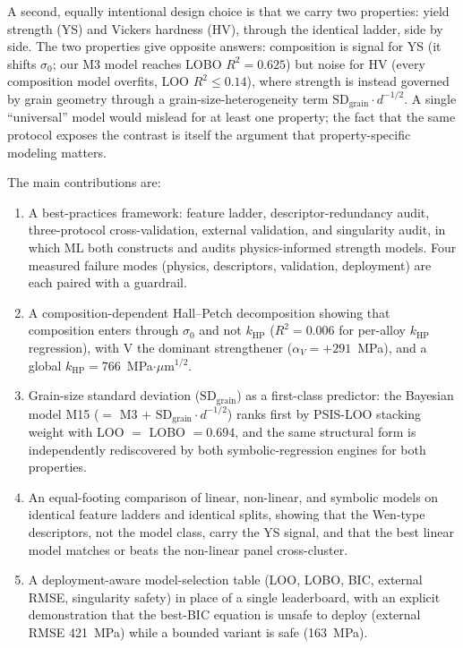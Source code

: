 \documentclass[5p,times,twocolumn]{elsarticle}
\begin{document}
A second, equally intentional design choice is that we carry two properties: yield strength (YS) and Vickers hardness (HV), through the identical ladder, side by side.
The two properties give opposite answers: composition is signal for YS (it shifts $\sigma_0$; our M3 model reaches LOBO $R^2 = 0.625$) but noise for HV (every composition model overfits, LOO $R^2 \leq 0.14$), where strength is instead governed by grain geometry through a grain-size-heterogeneity term $\text{SD}_\text{grain}\cdot d^{-1/2}$. A single ``universal'' model would mislead for at least one property; the fact that the same protocol exposes the contrast is itself the argument that property-specific modeling matters.

The main contributions are:
\begin{enumerate}
  \item A best-practices framework: feature ladder, descriptor-redundancy audit, three-protocol cross-validation, external validation, and singularity audit, in which ML both constructs and audits physics-informed strength models. Four measured failure modes (physics, descriptors, validation, deployment) are each paired with a guardrail.
  \item A composition-dependent Hall--Petch decomposition showing that composition enters through $\sigma_0$ and not $k_\text{HP}$ ($R^2 = 0.006$ for per-alloy $k_\text{HP}$ regression), with V the dominant strengthener ($\alpha_V = +291$~\si{MPa}), and a global $k_\text{HP} = 766$~MPa$\cdot\mu$m$^{1/2}$.
  \item Grain-size standard deviation ($\text{SD}_\text{grain}$) as a first-class predictor: the Bayesian model M15 ($= $ M3 $+$ $\text{SD}_\text{grain}\cdot d^{-1/2}$) ranks first by PSIS-LOO stacking weight with LOO $= $ LOBO $= 0.694$, and the same structural form is independently rediscovered by both symbolic-regression engines for both properties.
  \item An equal-footing comparison of linear, non-linear, and symbolic models on identical feature ladders and identical splits, showing that the Wen-type descriptors, not the model class, carry the YS signal, and that the best linear model matches or beats the non-linear panel cross-cluster.
  \item A deployment-aware model-selection table (LOO, LOBO, BIC, external RMSE, singularity safety) in place of a single leaderboard, with an explicit demonstration that the best-BIC equation is unsafe to deploy (external RMSE 421~\si{MPa}) while a bounded variant is safe (163~\si{MPa}).
\end{enumerate}
\end{document}
